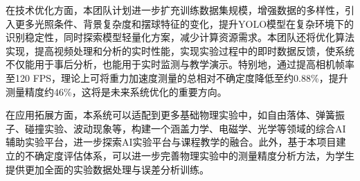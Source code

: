 在技术优化方面，本团队计划进一步扩充训练数据集规模，增强数据的多样性，引入更多光照条件、背景复杂度和摆球特征的变化，提升YOLO模型在复杂环境下的识别稳定性，同时探索模型轻量化方案，减少计算资源需求。本团队还将优化算法实现，提高视频处理和分析的实时性能，实现实验过程中的即时数据反馈，使系统不仅能用于事后分析，也能用于实时监测与教学演示。特别地，通过提高相机帧率至120 FPS，理论上可将重力加速度测量的总相对不确定度降低至约0.88\%，提升测量精度约46\%，这将是未来系统优化的重要方向。

在应用拓展方面，本系统可以适配到更多基础物理实验中，如自由落体、弹簧振子、碰撞实验、波动现象等，构建一个涵盖力学、电磁学、光学等领域的综合AI辅助实验平台，进一步探索AI实验平台与课程教学的融合。此外，基于本项目建立的不确定度评估体系，可以进一步完善物理实验中的测量精度分析方法，为学生提供更加全面的实验数据处理与误差分析训练。
